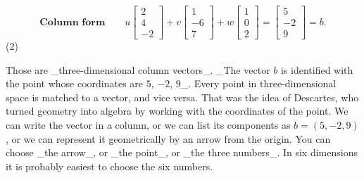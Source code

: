 \[\textbf{Column form}\qquad u\begin{bmatrix}2\\ 4\\ -2\end{bmatrix}+v\begin{bmatrix}1\\ -6\\ 7\end{bmatrix}+w\begin{bmatrix}1\\ 0\\ 2\end{bmatrix}=\begin{bmatrix}5\\ -2\\ 9\end{bmatrix}=b.\] (2)

Those are _three-dimensional column vectors_. _The vector \(b\) is identified with the point whose coordinates are \(5\), \(-2\), \(9\)_. Every point in three-dimensional space is matched to a vector, and vice versa. That was the idea of Descartes, who turned geometry into algebra by working with the coordinates of the point. We can write the vector in a column, or we can list its components as \(b=(5,-2,9)\), or we can represent it geometrically by an arrow from the origin. You can choose _the arrow_, or _the point_, or _the three numbers_. In six dimensions it is probably easiest to choose the six numbers.

 